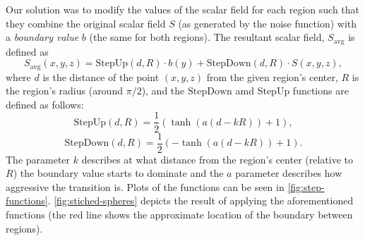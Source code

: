 Our solution was to modify the values of the scalar field for each region such that they combine the original scalar field $S$ (as generated by the noise function) with a \textit{boundary value} $b$ (the same for both regions).
The resultant scalar field, $S_{\mathrm{avg}}$ is defined as
\begin{equation*}
    S_{\mathrm{avg}}(x, y, z) = \mathrm{StepUp}(d, R) \cdot b(y) + \mathrm{StepDown}(d, R) \cdot S(x, y, z),
\end{equation*}
where $d$ is the distance of the point $(x, y, z)$ from the given region's center, $R$ is the region's radius (around $\pi / 2$), and the $\mathrm{StepDown}$ amd $\mathrm{StepUp}$ functions are defined as follows:
\begin{equation*}
    \mathrm{StepUp}(d, R) = \frac{1}{2} (\tanh(a (d - k R)) + 1),
\end{equation*}
\begin{equation*}
    \mathrm{StepDown}(d, R) = \frac{1}{2} (-\tanh(a (d - k R)) + 1).
\end{equation*}
The parameter $k$ describes at what distance from the region's center (relative to $R$) the boundary value starts to dominate and the $a$ parameter describes how aggressive the transition is.
Plots of the functions can be seen in \autoref{fig:step-functions}.
\autoref{fig:stiched-spheres} depicts the result of applying the aforementioned functions (the red line shows the approximate location of the boundary between regions).

